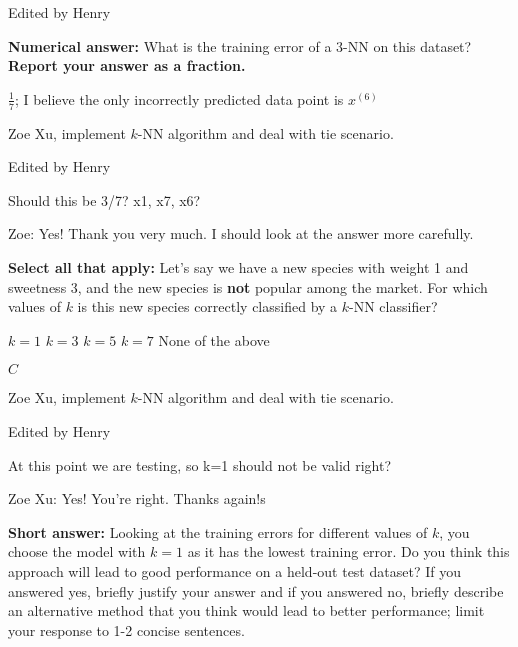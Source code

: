 \begin{parts}
\begin{subparts}
\begin{qauthor}
        Edited by Henry
    \end{qauthor}
    
    \subpart[2] \textbf{Numerical answer:} What is the training error of a $3$-NN on this dataset? \textbf{Report your answer as a fraction.}
    \begin{tcolorbox}[fit,height=1cm, width=2cm, blank, borderline={1pt}{-2pt}]
    \end{tcolorbox}
    \begin{soln}
        $\frac{1}{7}$; I believe the only incorrectly predicted data point is $x^{(6)}$
    \end{soln}
    \begin{qauthor}
        Zoe Xu, implement $k$-NN algorithm and deal with tie scenario.

        Edited by Henry 
    \end{qauthor}

\begin{qtester}
    Should this be 3/7? x1, x7, x6?
    
    Zoe: Yes! Thank you very much. I should look at the answer more carefully.
\end{qtester}
    
    \subpart[2] \textbf{Select all that apply:} Let's say we have a new species with weight 1 and sweetness 3, and the new species is \textbf{not} popular among the market. For which values of $k$ is this new species correctly classified by a $k$-NN classifier?
    {
    \checkboxchar{$\Box$} \checkedchar{$\blacksquare$} %
    \begin{checkboxes}
     \choice $k = 1$
     \choice $k = 3$
     \choice $k = 5$
     \choice $k = 7$
     \choice None of the above
    \end{checkboxes}
    }
    \begin{soln}
    $C$
    \end{soln}
    \begin{qauthor}
        Zoe Xu, implement $k$-NN algorithm and deal with tie scenario.

        Edited by Henry
    \end{qauthor}
    \begin{qtester}
    At this point we are testing, so k=1 should not be valid right? 

    Zoe Xu: Yes! You're right. Thanks again!s
    \end{qtester}

    \subpart[2] \textbf{Short answer:} Looking at the training errors for different values of $k$, you choose the model with $k = 1$ as it has the lowest training error. Do you think this approach will lead to good performance on a held-out test dataset? If you answered yes, briefly justify your answer and if you answered no, briefly describe an alternative method that you think would lead to better performance; limit your response to 1-2 concise sentences. 
    

\end{subparts}
\end{parts}
